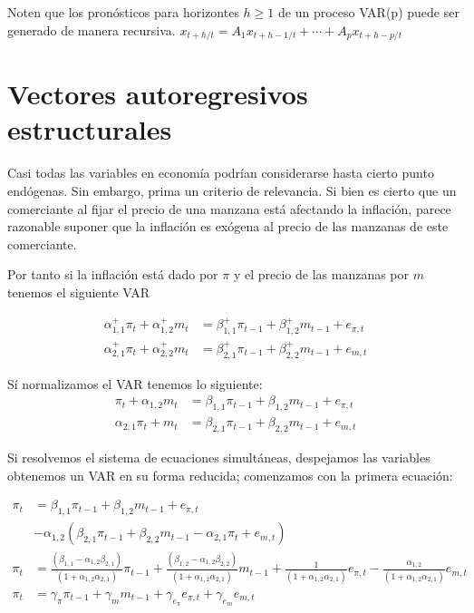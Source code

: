 \documentclass[
]{book}
\begin{document}
Noten que los pronósticos para horizontes \(h\geq1\) de un proceso VAR(p) puede ser generado de manera recursiva.
\(x_{t+h/t} = A_{1}x_{t+h-1/t} + \cdots+A_{p}x_{t+h-p/t}\)

\hypertarget{vectores-autoregresivos-estructurales}{%
\section{Vectores autoregresivos estructurales}\label{vectores-autoregresivos-estructurales}}

Casi todas las variables en economía podrían considerarse
hasta cierto punto endógenas. Sin embargo, prima un criterio de relevancia. Si bien es cierto que un comerciante al fijar el precio de una manzana está afectando la inflación, parece razonable suponer que la inflación es exógena al precio de las manzanas de este comerciante.

Por tanto si la inflación está dado por \(\pi\) y el precio de las manzanas por \(m\) tenemos el siguiente VAR

\begin{align}
\alpha_{1,1}^{+}\pi_t+\alpha_{1,2}^{+}m_t &= \beta_{1,1}^{+}\pi_{t-1}+\beta_{1,2}^{+}m_{t-1}+e_{\pi,t}\\
\alpha_{2,1}^{+}\pi_t+\alpha_{2,2}^{+}m_t &= \beta_{2,1}^{+}\pi_{t-1}+\beta_{2,2}^{+}m_{t-1}+e_{m,t}
\end{align}

Sí normalizamos el VAR tenemos lo siguiente:
\begin{align}
\pi_t+\alpha_{1,2}m_t &= \beta_{1,1}\pi_{t-1}+\beta_{1,2}m_{t-1}+e_{\pi,t}\\
\alpha_{2,1}\pi_t+m_t &= \beta_{2,1}\pi_{t-1}+\beta_{2,2}m_{t-1}+e_{m,t}
\end{align}

Si resolvemos el sistema de ecuaciones simultáneas, despejamos las
variables obtenemos un VAR en su forma reducida; comenzamos con la primera ecuación:

\begin{align}
\pi_{t} &=\beta_{1,1}\pi_{t-1}+\beta_{1,2}m_{t-1}+e_{\pi,t}\\
        &- \alpha_{1,2}(\beta_{2,1}\pi_{t-1}+\beta_{2,2}m_{t-1}-\alpha_{2,1}\pi_t+e_{m,t})\\
        \pi_{t} &=\frac{(\beta_{1,1}-\alpha_{1,2}\beta_{2,1})}{(1+\alpha_{1,2}\alpha_{2,1})}\pi_{t-1}+ \frac{(\beta_{1,2}-\alpha_{1,2}\beta_{2,2})}{(1+\alpha_{1,2}\alpha_{2,1})}m_{t-1}+\frac{1}{(1+\alpha_{1,2}\alpha_{2,1})}e_{\pi,t}- \frac{\alpha_{1,2}}{(1+\alpha_{1,2}\alpha_{2,1})}e_{m,t}\\
 \pi_{t}&=\gamma_{\pi}\pi_{t-1}+\gamma_{m}m_{t-1}+\gamma_{e_{\pi}}e_{\pi,t}+\gamma_{e_{m}}e_{m,t}       
\end{align}
\end{document}
